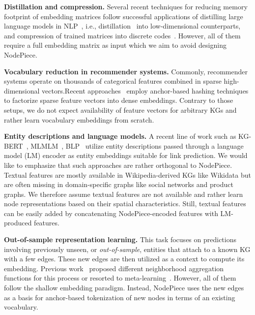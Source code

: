 \documentclass{article} \usepackage{iclr2022_conference,times}
\begin{document}
\textbf{Distillation and compression.} 
Several recent techniques for reducing memory footprint of embedding matrices follow successful applications of distilling large language models in NLP~\citep{DBLP:journals/corr/abs-1910-01108}, i.e., 
 distillation~\citep{wang2020mulde,zhu2020distile} into low-dimensional counterparts, and compression of trained matrices into discrete codes~\citep{sachan-2020-knowledge}. 
However, all of them require a full embedding matrix as input which we aim to avoid designing NodePiece.

\textbf{Vocabulary reduction in recommender systems.} 
Commonly, recommender systems operate on thousands of categorical features combined in sparse high-dimensional vectors.Recent approaches~\citep{medini2021solar,liang2021anchor}  employ anchor-based hashing techniques to factorize sparse feature vectors into dense embeddings. 
Contrary to those setups, we do not expect availability of feature vectors for arbitrary KGs and rather learn vocabulary embeddings from scratch.

\textbf{Entity descriptions and language models.} 
A recent line of work such as KG-BERT~\citep{DBLP:journals/corr/abs-1909-03193}, MLMLM~\citep{DBLP:conf/acl/ClouatreTZC21}, BLP~\citep{DBLP:conf/www/DazaCG21} utilize entity descriptions passed through a language model (LM) encoder as entity embeddings suitable for link prediction.
We would like to emphasize that such approaches are rather orthogonal to NodePiece. Textual features are mostly available in Wikipedia-derived KGs like Wikidata but are often missing in domain-specific graphs like social networks and product graphs. We therefore assume textual features are not available and rather learn node representations based on their spatial characteristics. 
Still, textual features can be easily added by concatenating NodePiece-encoded features with LM-produced features.

\textbf{Out-of-sample representation learning.}
This task focuses on predictions involving previously unseen, or \emph{out-of-sample}, entities that attach to a known KG with a few edges. 
These new edges are then utilized as a context to compute its embedding. 
Previous work~\citep{wang2019logic, DBLP:conf/ijcai/HamaguchiOSM17, albooyeh-etal-2020-sample} proposed different neighborhood aggregation functions for this process or resorted to meta-learning~\citep{chen2019meta, baek2020learning, zhang2020few}.
However, all of them follow the shallow embedding paradigm.
Instead, NodePiece uses the new edges as a basis for anchor-based tokenization of new nodes in terms of an existing vocabulary. 
\end{document}
